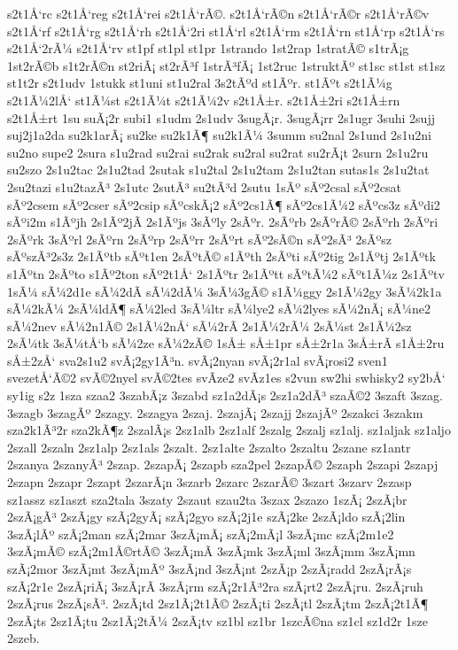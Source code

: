 {s2t1Å‘rc
s2t1Å‘reg
s2t1Å‘rei
s2t1Å‘rÃ©.
s2t1Å‘rÃ©n
s2t1Å‘rÃ©r
s2t1Å‘rÃ©v
s2t1Å‘rf
s2t1Å‘rg
s2t1Å‘rh
s2t1Å‘2ri
st1Å‘rl
s2t1Å‘rm
s2t1Å‘rn
st1Å‘rp
s2t1Å‘rs
s2t1Å‘2rÃ¼
s2t1Å‘rv
st1pf
st1pl
st1pr
1strando
1st2rap
1stratÃ©
s1trÃ¡g
1st2rÃ©b
s1t2rÃ©n
st2riÃ¡
st2rÃ³f
1strÃ³fÃ¡
1st2ruc
1struktÃº
st1sc
st1st
st1sz
st1t2r
s2t1udv
1stukk
st1uni
st1u2ral
3s2tÃºd
st1Ãºr.
st1Ãºt
s2t1Ã¼g
s2t1Ã¼2lÅ‘
st1Ã¼st
s2t1Ã¼t
s2t1Ã¼2v
s2t1Å±r.
s2t1Å±2ri
s2t1Å±rn
s2t1Å±rt
1su
suÃ¡2r
subi1
s1udm
2s1udv
3sugÃ¡r.
3sugÃ¡rr
2s1ugr
3suhi
2sujj
suj2j1a2da
su2k1arÃ¡
su2ke
su2k1Ã¶
su2k1Ã¼
3summ
su2nal
2s1und
2s1u2ni
su2no
supe2
2sura
s1u2rad
su2rai
su2rak
su2ral
su2rat
su2rÃ¡t
2surn
2s1u2ru
su2szo
2s1u2tac
2s1u2tad
2sutak
s1u2tal
2s1u2tam
2s1u2tan
sutas1s
2s1u2tat
2su2tazi
s1u2tazÃ³
2s1utc
2sutÃ³
su2tÃ³d
2sutu
1sÃº
sÃº2csal
sÃº2csat
sÃº2csem
sÃº2cser
sÃº2csip
sÃºcskÃ¡2
sÃº2cs1Ã¶
sÃº2cs1Ã¼2
sÃºcs3z
sÃºdi2
sÃºi2m
s1Ãºjh
2s1Ãº2jÃ­
2s1Ãºjs
3sÃºly
2sÃºr.
2sÃºrb
2sÃºrÃ©
2sÃºrh
2sÃºri
2sÃºrk
3sÃºrl
2sÃºrn
2sÃºrp
2sÃºrr
2sÃºrt
sÃº2sÃ©n
sÃº2sÃ³
2sÃºsz
sÃºszÃ³2s3z
2s1Ãºtb
sÃºt1en
2sÃºtÃ©
s1Ãºth
2sÃºti
sÃº2tig
2s1Ãºtj
2s1Ãºtk
s1Ãºtn
2sÃºto
s1Ãº2ton
sÃº2t1Å‘
2s1Ãºtr
2s1Ãºtt
sÃºtÃ¼2
sÃºt1Ã¼z
2s1Ãºtv
1sÃ¼
sÃ¼2d1e
sÃ¼2dÃ­
sÃ¼2dÃ¼
3sÃ¼3gÃ©
s1Ã¼ggy
2s1Ã¼2gy
3sÃ¼2k1a
sÃ¼2kÃ¼
2sÃ¼ldÃ¶
sÃ¼2led
3sÃ¼ltr
sÃ¼lye2
sÃ¼2lyes
sÃ¼2nÃ¡
sÃ¼ne2
sÃ¼2nev
sÃ¼2n1Ã©
2s1Ã¼2nÅ‘
sÃ¼2rÃ­
2s1Ã¼2rÃ¼
2sÃ¼st
2s1Ã¼2sz
2sÃ¼tk
3sÃ¼tÅ‘b
sÃ¼2ze
sÃ¼2zÃ©
1sÅ±
sÅ±1pr
sÅ±2r1a
3sÅ±rÃ­
s1Å±2ru
sÅ±2zÅ‘
sva2s1u2
svÃ¡2gy1Ã³n.
svÃ¡2nyan
svÃ¡2r1al
svÃ¡rosi2
sven1
svezetÅ‘Ã©2
svÃ©2nyel
svÃ©2tes
svÃ­ze2
svÃ­z1es
s2vun
sw2hi
swhisky2
sy2bÅ‘
sy1ig
s2z
1sza
szaa2
3szabÃ¡z
3szabd
sz1a2dÃ¡s
2sz1a2dÃ³
szaÃ©2
3szaft
3szag.
3szagb
3szagÃº
2szagy.
2szagya
2szaj.
2szajÃ¡
2szajj
2szajÃº
2szakci
3szakm
sza2k1Ã³2r
sza2kÃ¶z
2szalÃ¡s
2sz1alb
2sz1alf
2szalg
2szalj
sz1alj.
sz1aljak
sz1aljo
2szall
2szaln
2sz1alp
2sz1als
2szalt.
2sz1alte
2szalto
2szaltu
2szane
sz1antr
2szanya
2szanyÃ³
2szap.
2szapÃ¡
2szapb
sza2pel
2szapÃ©
2szaph
2szapi
2szapj
2szapn
2szapr
2szapt
2szarÃ¡n
3szarb
2szarc
2szarÃ©
3szart
3szarv
2szasp
sz1assz
sz1aszt
sza2tala
3szaty
2szaut
szau2ta
3szax
2szazo
1szÃ¡
2szÃ¡br
2szÃ¡gÃ³
2szÃ¡gy
szÃ¡2gyÃ¡
szÃ¡2gyo
szÃ¡2j1e
szÃ¡2ke
2szÃ¡ldo
szÃ¡2lin
3szÃ¡lÃº
szÃ¡2man
szÃ¡2mar
3szÃ¡mÃ¡
szÃ¡2mÃ¡l
3szÃ¡mc
szÃ¡2m1e2
3szÃ¡mÃ©
szÃ¡2m1Ã©rtÃ©
3szÃ¡mÃ­
3szÃ¡mk
3szÃ¡ml
3szÃ¡mm
3szÃ¡mn
szÃ¡2mor
3szÃ¡mt
3szÃ¡mÃº
3szÃ¡nd
3szÃ¡nt
2szÃ¡p
2szÃ¡radd
2szÃ¡rÃ¡s
szÃ¡2r1e
2szÃ¡riÃ¡
3szÃ¡rÃ­
3szÃ¡rm
szÃ¡2r1Ã³2ra
szÃ¡rt2
2szÃ¡ru.
2szÃ¡ruh
2szÃ¡rus
2szÃ¡sÃ³.
2szÃ¡td
2sz1Ã¡2t1Ã©
2szÃ¡ti
2szÃ¡tl
2szÃ¡tm
2szÃ¡2t1Ã¶
2szÃ¡ts
2sz1Ã¡tu
2sz1Ã¡2tÃ¼
2szÃ¡tv
sz1bl
sz1br
1szcÃ©na
sz1cl
sz1d2r
1sze
2szeb.
}
